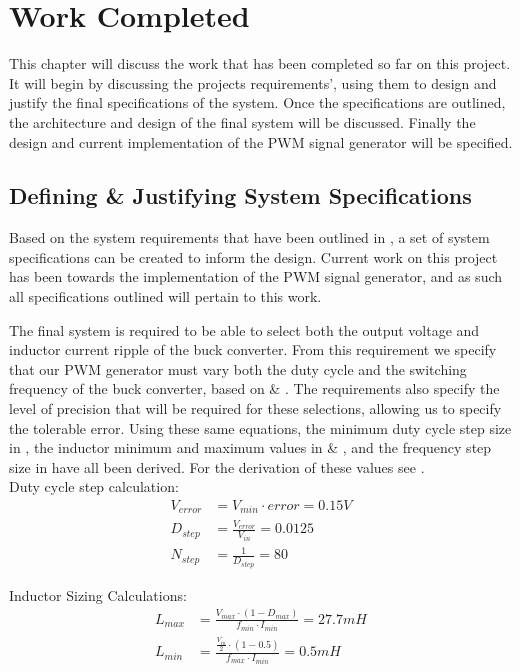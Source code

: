 \chapter{Work Completed}\label{C:work}

This chapter will discuss the work that has been completed so far on this project. It will begin by discussing the projects requirements', using them to design and justify the final specifications of the system. Once the specifications are outlined, the architecture and design of the final system will be discussed. Finally the design and current implementation of the PWM signal generator will be specified.  

\section{Defining \& Justifying System Specifications}\label{S:specs}

Based on the system requirements that have been outlined in , a set of system specifications can be created to inform the design. Current work on this project has been towards the implementation of the PWM signal generator, and as such all specifications outlined will pertain to this work.

The final system is required to be able to select both the output voltage and inductor current ripple of the buck converter. From this requirement we specify that our PWM generator must vary both the duty cycle and the switching frequency of the buck converter, based on  \& . The requirements also specify the level of precision that will be required for these selections, allowing us to specify the tolerable error. Using these same equations, the minimum duty cycle step size in , the inductor minimum and maximum values in  \& , and the frequency step size in  have all been derived. For the derivation of these values see .\\

Duty cycle step calculation:
\begin{align}
    V_{error} &= V_{min} \cdot error = 0.15V\\
    D_{step} &= \frac{V_{error}}{V_{in}} = 0.0125\\
    N_{step} &= \frac{1}{D_{step}} = 80 \label{E:duty_step}
\end{align}

Inductor Sizing Calculations:
\begin{align}
    L_{max}&=\frac{V_{max}\cdot\left(1-D_{max}\right)}{f_{min}\cdot I_{min}} = 27.7mH \label{E:L_max}\\ 
    L_{min}&=\frac{\frac{V_{in}}{2}\cdot\left(1-0.5\right)}{f_{max}\cdot I_{min}} = 0.5mH \label{E:L_min}
\end{align}

